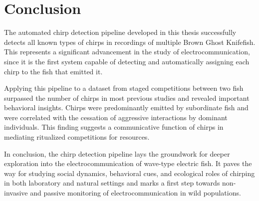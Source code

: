 \section{Conclusion} %
\label{sec:conclusion}

The automated chirp detection pipeline developed in this thesis successfully
detects all known types of chirps in recordings of multiple Brown Ghost
Knifefish. This represents a significant advancement in the study of
electrocommunication, since it is the first system capable of detecting and
automatically assigning each chirp to the fish that emitted it.

Applying this pipeline to a dataset from staged competitions between two fish
surpassed the number of chirps in most previous studies and revealed important
behavioral insights. Chirps were predominantly emitted by subordinate fish and
were correlated with the cessation of aggressive interactions by dominant
individuals. This finding suggests a communicative function of chirps in
mediating ritualized competitions for resources.

In conclusion, the chirp detection pipeline lays the groundwork for deeper
exploration into the electrocommunication of wave-type electric fish. It paves
the way for studying social dynamics, behavioral cues, and ecological roles of
chirping in both laboratory and natural settings and marks a first step towards
non-invasive and passive monitoring of electrocommunication in wild
populations.



